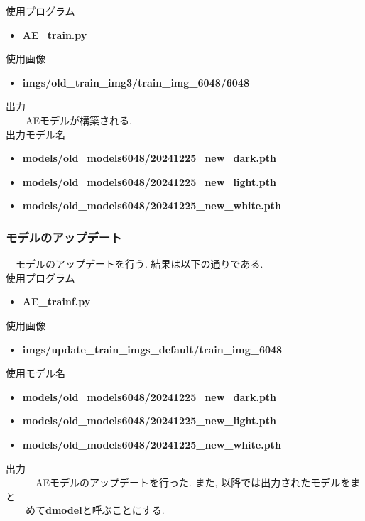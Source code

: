 \documentclass[a4paper, 12pt]{report}
\begin{document}
使用プログラム
\begin{itemize}
    \item \textbf{AE\_train.py}
\end{itemize}

使用画像
\begin{itemize}
    \item \textbf{imgs/old\_train\_img3/train\_img\_6048/6048}
\end{itemize}

出力\\
　　AEモデルが構築される. \\

出力モデル名
\begin{itemize}
    \item \textbf{models/old\_models6048/20241225\_new\_dark.pth}
    \item \textbf{models/old\_models6048/20241225\_new\_light.pth}
    \item \textbf{models/old\_models6048/20241225\_new\_white.pth}
\end{itemize}

\subsubsection{モデルのアップデート}
　モデルのアップデートを行う. 結果は以下の通りである. \\

使用プログラム
\begin{itemize}
    \item \textbf{AE\_trainf.py}
\end{itemize}

使用画像
\begin{itemize}
    \item \textbf{imgs/update\_train\_imgs\_default/train\_img\_6048}
\end{itemize}

使用モデル名
\begin{itemize}
    \item \textbf{models/old\_models6048/20241225\_new\_dark.pth}
    \item \textbf{models/old\_models6048/20241225\_new\_light.pth}
    \item \textbf{models/old\_models6048/20241225\_new\_white.pth}
\end{itemize}

出力\\
　　　AEモデルのアップデートを行った. また, 以降では出力されたモデルをまと\\
　　めて\textbf{dmodel}と呼ぶことにする. \\
\end{document}
